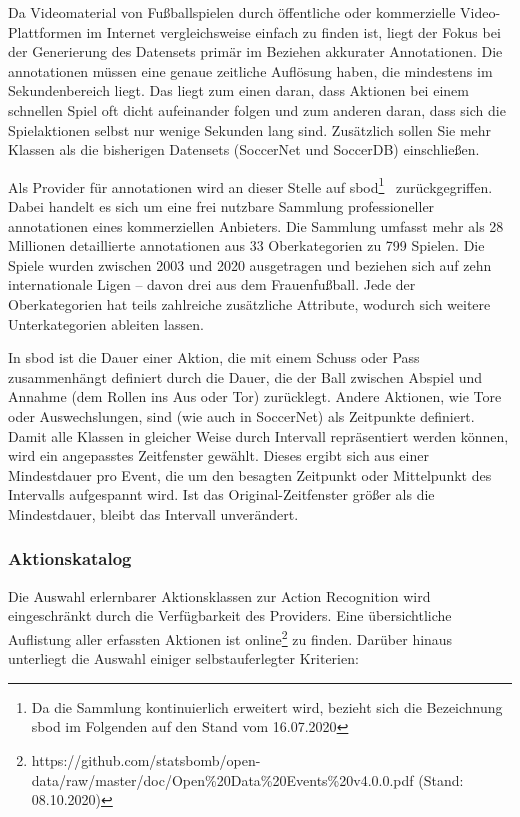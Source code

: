 Da Videomaterial von Fußballspielen durch öffentliche oder kommerzielle Video-Plattformen im Internet vergleichsweise einfach zu finden ist, liegt der Fokus bei der Generierung des Datensets primär im Beziehen akkurater Annotationen.
Die \gls{annotationen} müssen eine genaue zeitliche Auflösung haben, die mindestens im Sekundenbereich liegt.
Das liegt zum einen daran, dass Aktionen bei einem schnellen Spiel oft dicht aufeinander folgen und zum anderen daran, dass sich die Spielaktionen selbst nur wenige Sekunden lang sind.
Zusätzlich sollen Sie mehr Klassen als die bisherigen Datensets (SoccerNet und SoccerDB) einschließen.

Als Provider für \gls{annotationen} wird an dieser Stelle auf \gls{sbod}\footnote{Da die Sammlung kontinuierlich erweitert wird, bezieht sich die Bezeichnung \gls{sbod} im Folgenden auf den Stand vom 16.07.2020}~\cite{Statsbomb20} zurückgegriffen.
Dabei handelt es sich um eine frei nutzbare Sammlung professioneller \gls{annotationen} eines kommerziellen Anbieters.
Die Sammlung umfasst mehr als 28 Millionen detaillierte \gls{annotationen} aus 33 Oberkategorien zu 799 Spielen.
Die Spiele wurden zwischen 2003 und 2020 ausgetragen und beziehen sich auf zehn internationale Ligen -- davon drei aus dem Frauenfußball.
Jede der Oberkategorien hat teils zahlreiche zusätzliche Attribute, wodurch sich weitere Unterkategorien ableiten lassen.

In \gls{sbod} ist die Dauer einer Aktion, die mit einem Schuss oder Pass zusammenhängt definiert durch die Dauer, die der Ball zwischen Abspiel und Annahme (\bzw dem Rollen ins Aus oder Tor) zurücklegt.
Andere Aktionen, wie Tore oder Auswechslungen, sind (wie auch in SoccerNet) als Zeitpunkte definiert.
Damit alle Klassen in gleicher Weise durch Intervall repräsentiert werden können, wird ein angepasstes Zeitfenster gewählt.
Dieses ergibt sich aus einer Mindestdauer pro Event, die um den besagten Zeitpunkt oder Mittelpunkt des Intervalls aufgespannt wird.
Ist das Original-Zeitfenster größer als die Mindestdauer, bleibt das Intervall unverändert.

\subsubsection*{Aktionskatalog}

Die Auswahl erlernbarer Aktionsklassen zur Action Recognition wird eingeschränkt durch die Verfügbarkeit des Providers.
Eine übersichtliche Auflistung aller erfassten Aktionen ist online\footnote{https://github.com/statsbomb/open-data/raw/master/doc/Open\%20Data\%20Events\%20v4.0.0.pdf (Stand: 08.10.2020)} zu finden.
Darüber hinaus unterliegt die Auswahl einiger selbstauferlegter Kriterien:


